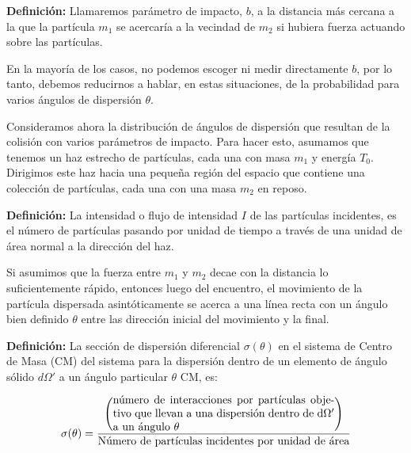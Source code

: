 \documentclass[a4paper,10pt]{article}
\numberwithin{equation}{section}
\newcommand{\definicion}{\textbf{Definición: }}
\begin{document}
\vspace{.3cm}

\definicion Llamaremos parámetro de impacto, $b$, a la distancia 
más cercana a la que la partícula $m_1$ se acercaría a la vecindad de $m_2$
si hubiera fuerza actuando sobre las partículas.

\vspace{.3cm}

En la mayoría de los casos, no podemos escoger ni medir directamente $b$,
por lo tanto, debemos reducirnos a hablar, en estas situaciones, de la probabilidad
para varios ángulos de dispersión $\theta$.

\vspace{.3cm}

Consideramos ahora la distribución de ángulos de dispersión que resultan 
de la colisión con varios parámetros de impacto. Para hacer esto, asumamos
que tenemos un haz estrecho de partículas, cada una con masa $m_1$ y energía 
$T_0$. Dirigimos este haz hacia una pequeña región del espacio que contiene 
una colección de partículas, cada una con una masa $m_2$ en reposo. 

\vspace{.3cm}

\definicion La intensidad o flujo de intensidad $I$ de las partículas
incidentes, es el número de partículas pasando por unidad de tiempo a través 
de una unidad de área normal a la dirección del haz. 

\vspace{.3cm}

Si asumimos que la fuerza entre $m_1$ y $m_2$ decae con la distancia 
lo suficientemente rápido, entonces luego del encuentro, el movimiento 
de la partícula dispersada asintóticamente se acerca a una línea 
recta con un ángulo bien definido $\theta$ entre las dirección inicial
del movimiento y la final.

\vspace{.3cm}

\definicion La sección de dispersión diferencial $\sigma (\theta)$ en el 
sistema de Centro de Masa (CM) del sistema para la dispersión dentro de 
un elemento de ángulo sólido $d\Omega'$ a un ángulo particular $\theta$ CM,
es:

\begin{equation}
 \sigma(\theta) = \frac{\left(\text{\parbox{20em}{número de interacciones por partículas objetivo que
 llevan a una dispersión dentro de d$\Omega'$ a un ángulo $\theta$}} \right)}{\text{Número de 
 partículas incidentes por unidad de área}}
 \label{eq:disper1}
\end{equation}
\end{document}
